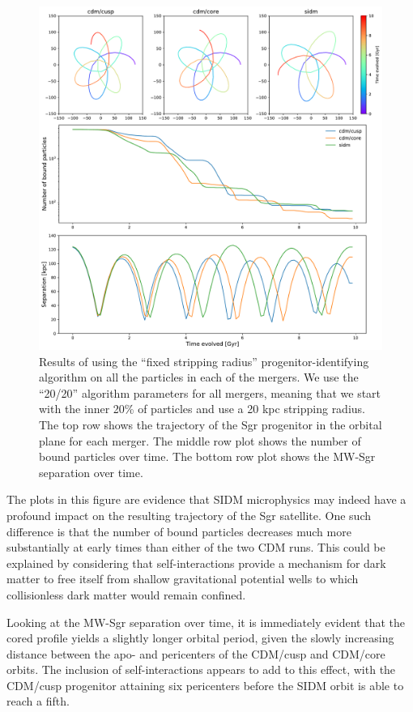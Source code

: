 \begin{figure}
    \centering
    \includegraphics[width=0.9\linewidth]{figs/all_mergers_pretty.pdf}
    \caption{%
        Results of using the ``fixed stripping radius'' progenitor-identifying
        algorithm on all the particles in each of the mergers. We use the
        ``20/20'' algorithm parameters for all mergers, meaning that we start
        with the inner 20\% of particles and use a 20 kpc stripping radius. The
        top row shows the trajectory of the Sgr progenitor in the orbital plane
        for each merger. The middle row plot shows the number of bound particles
        over time. The bottom row plot shows the MW-Sgr separation over time.
    }
    \label{fig:all}
\end{figure}

The plots in this figure are evidence that SIDM microphysics may indeed have a
profound impact on the resulting trajectory of the Sgr satellite.  One such
difference is that the number of bound particles decreases much more
substantially at early times than either of the two CDM runs.  This could be
explained by considering that self-interactions provide a mechanism for dark
matter to free itself from shallow gravitational potential wells to which
collisionless dark matter would remain confined.

Looking at the MW-Sgr separation over time, it is immediately evident that the
cored profile yields a slightly longer orbital period, given the slowly
increasing distance between the apo- and pericenters of the CDM/cusp and
CDM/core orbits.  The inclusion of self-interactions appears to add to this
effect, with the CDM/cusp progenitor attaining six pericenters before the SIDM
orbit is able to reach a fifth.

